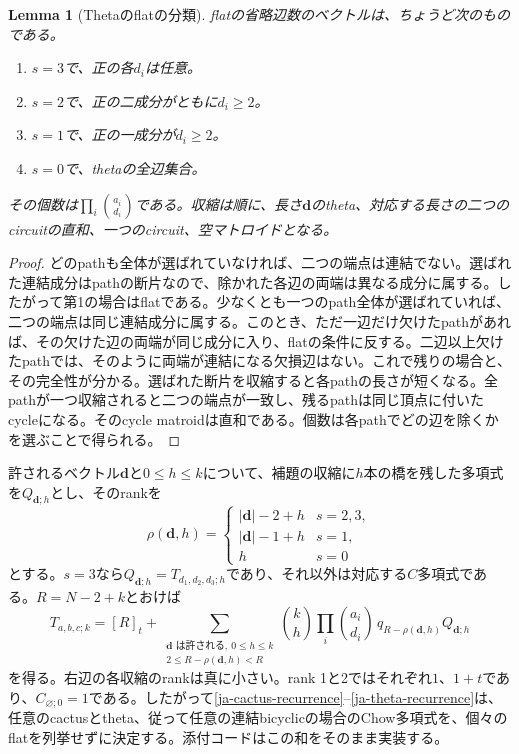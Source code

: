 \documentclass[12pt]{amsart}
\newtheorem{lem}[thm]{Lemma}
\theoremstyle{definition}
\theoremstyle{remark}
\numberwithin{equation}{section}
\begin{document}
\begin{samepage}
\begin{lem}[Thetaのflatの分類]\label{ja-theta-flats}
flatの省略辺数のベクトルは、ちょうど次のものである。
\begin{enumerate}
\item $s=3$で、正の各$d_i$は任意。
\item $s=2$で、正の二成分がともに$d_i\geq2$。
\item $s=1$で、正の一成分が$d_i\geq2$。
\item $s=0$で、thetaの全辺集合。
\end{enumerate}
その個数は$\prod_i\binom{a_i}{d_i}$である。収縮は順に、長さ$\boldsymbol d$のtheta、対応する長さの二つのcircuitの直和、一つのcircuit、空マトロイドとなる。
\end{lem}
\end{samepage}
\begin{proof}
どのpathも全体が選ばれていなければ、二つの端点は連結でない。選ばれた連結成分はpathの断片なので、除かれた各辺の両端は異なる成分に属する。したがって第1の場合はflatである。少なくとも一つのpath全体が選ばれていれば、二つの端点は同じ連結成分に属する。このとき、ただ一辺だけ欠けたpathがあれば、その欠けた辺の両端が同じ成分に入り、flatの条件に反する。二辺以上欠けたpathでは、そのように両端が連結になる欠損辺はない。これで残りの場合と、その完全性が分かる。選ばれた断片を収縮すると各pathの長さが短くなる。全pathが一つ収縮されると二つの端点が一致し、残るpathは同じ頂点に付いたcycleになる。そのcycle matroidは直和である。個数は各pathでどの辺を除くかを選ぶことで得られる。
\end{proof}

許されるベクトル$\boldsymbol d$と$0\leq h\leq k$について、補題の収縮に$h$本の橋を残した多項式を$Q_{\boldsymbol d;h}$とし、そのrankを
\[
 \rho(\boldsymbol d,h)=
 \begin{cases}|\boldsymbol d|-2+h&s=2,3,\\
 |\boldsymbol d|-1+h&s=1,\\h&s=0
 \end{cases}
\]
とする。$s=3$なら$Q_{\boldsymbol d;h}=T_{d_1,d_2,d_3;h}$であり、それ以外は対応する$C$多項式である。$R=N-2+k$とおけば
\begin{equation}\label{ja-theta-recurrence}
 T_{a,b,c;k}=[R]_t+
 \sum_{\substack{\boldsymbol d\text{ は許される},\ 0\leq h\leq k\\
                  2\leq R-\rho(\boldsymbol d,h)<R}}
 \binom{k}{h}\prod_i\binom{a_i}{d_i}\,
 q_{R-\rho(\boldsymbol d,h)}Q_{\boldsymbol d;h}
\end{equation}
を得る。右辺の各収縮のrankは真に小さい。rank 1と2ではそれぞれ$1$、$1+t$であり、$C_{\varnothing;0}=1$である。したがって\eqref{ja-cactus-recurrence}--\eqref{ja-theta-recurrence}は、任意のcactusとtheta、従って任意の連結bicyclicの場合のChow多項式を、個々のflatを列挙せずに決定する。添付コードはこの和をそのまま実装する。
\end{document}
